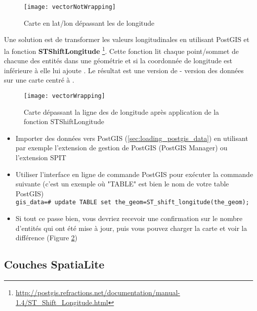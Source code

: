 \begin{figure}[ht]
   \begin{center}
   \caption{Carte en lat/lon dépassant les  de longitude \nixcaption}
   \label{fig:vector_not_wrapping}\smallskip
   \texttt{[image: vectorNotWrapping]}
\end{center}
\end{figure}

Une solution est de transformer les valeurs longitudinales en utilisant PostGIS et la fonction \textbf{ST\textunderscore Shift\textunderscore Longitude}
\footnote{\url{http://postgis.refractions.net/documentation/manual-1.4/ST_Shift_Longitude.html}}. Cette fonction lit chaque point/sommet de chacune des entités dans une géométrie et si la coordonnée de longitude est inférieure à  elle lui ajoute . Le résultat est une version de  -  version des données sur une carte centré à .

\begin{figure}[ht]
   \begin{center}
   \caption{Carte dépassant la ligne des  de longitude après application de la fonction ST\textunderscore Shift\textunderscore Longitude}
\label{fig:vector_wrapping}\smallskip
   \texttt{[image: vectorWrapping]}
\end{center}
\end{figure}


\begin{itemize}
\item Importer des données vers PostGIS (\ref{sec:loading_postgis_data}) en utilisant par exemple l'extension de gestion de PostGIS (PostGIS Manager) ou l'extension SPIT
\item Utiliser l'interface en ligne de commande PostGIS pour exécuter la commande suivante (c'est un exemple où "TABLE" est bien le nom de votre table PostGIS) \\ 
\texttt{gis\_data=\# update TABLE set the\_geom=ST\_shift\_longitude(the\_geom);} 
\item Si tout ce passe bien, vous devriez recevoir une confirmation sur le nombre d'entités qui ont été mise à jour, puis vous pouvez charger la carte et voir la différence (Figure \ref{fig:vector_wrapping})
\end{itemize}

\subsection{Couches SpatiaLite} 
\label{label_spatialite} 


